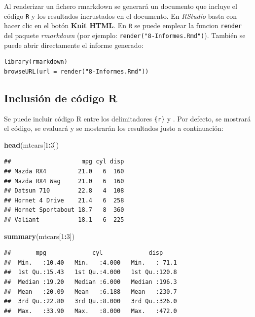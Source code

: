 \documentclass[]{book}
\newenvironment{Shaded}{\begin{snugshade}}{\end{snugshade}}
\newcommand{\KeywordTok}[1]{\textcolor[rgb]{0.13,0.29,0.53}{\textbf{#1}}}
\newcommand{\DecValTok}[1]{\textcolor[rgb]{0.00,0.00,0.81}{#1}}
\newcommand{\OperatorTok}[1]{\textcolor[rgb]{0.81,0.36,0.00}{\textbf{#1}}}
\newcommand{\NormalTok}[1]{#1}
\begin{document}
Al renderizar un fichero rmarkdown se generará un documento que incluye
el código \texttt{R} y los resultados incrustados en el documento. En
\emph{RStudio} basta con hacer clic en el botón \textbf{Knit HTML}. En
\texttt{R} se puede emplear la funcion \texttt{render} del paquete
\emph{rmarkdown} (por ejemplo: \texttt{render("8-Informes.Rmd")}).
También se puede abrir directamente el informe generado:

\begin{verbatim}
library(rmarkdown)
browseURL(url = render("8-Informes.Rmd"))
\end{verbatim}

\subsection{Inclusión de código R}\label{inclusion-de-codigo-r}

Se puede incluir código R entre los delimitadores
\texttt{\textasciigrave{}\textasciigrave{}\textasciigrave{}\{r\}} y
\texttt{\textasciigrave{}\textasciigrave{}\textasciigrave{}}. Por
defecto, se mostrará el código, se evaluará y se mostrarán los
resultados justo a continuación:

\begin{Shaded}
\begin{Highlighting}[]
\KeywordTok{head}\NormalTok{(mtcars[}\DecValTok{1}\OperatorTok{:}\DecValTok{3}\NormalTok{])}
\end{Highlighting}
\end{Shaded}

\begin{verbatim}
##                    mpg cyl disp
## Mazda RX4         21.0   6  160
## Mazda RX4 Wag     21.0   6  160
## Datsun 710        22.8   4  108
## Hornet 4 Drive    21.4   6  258
## Hornet Sportabout 18.7   8  360
## Valiant           18.1   6  225
\end{verbatim}

\begin{Shaded}
\begin{Highlighting}[]
\KeywordTok{summary}\NormalTok{(mtcars[}\DecValTok{1}\OperatorTok{:}\DecValTok{3}\NormalTok{])}
\end{Highlighting}
\end{Shaded}

\begin{verbatim}
##       mpg             cyl             disp      
##  Min.   :10.40   Min.   :4.000   Min.   : 71.1  
##  1st Qu.:15.43   1st Qu.:4.000   1st Qu.:120.8  
##  Median :19.20   Median :6.000   Median :196.3  
##  Mean   :20.09   Mean   :6.188   Mean   :230.7  
##  3rd Qu.:22.80   3rd Qu.:8.000   3rd Qu.:326.0  
##  Max.   :33.90   Max.   :8.000   Max.   :472.0
\end{verbatim}
\end{document}
